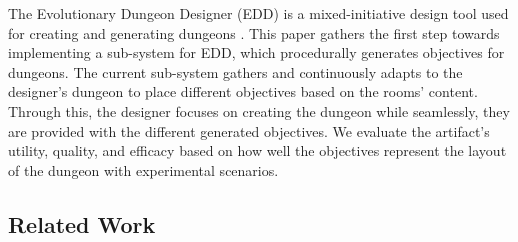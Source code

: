 
The Evolutionary Dungeon Designer (EDD) is a mixed-initiative design tool used for creating and generating dungeons \cite{p7alvarexempowering}. This paper gathers the first step towards implementing a sub-system for EDD, which procedurally generates objectives for dungeons. The current sub-system gathers and continuously adapts to the designer's dungeon to place different objectives based on the rooms' content. Through this, the designer focuses on creating the dungeon while seamlessly, they are provided with the different generated objectives. We evaluate the artifact's utility, quality, and efficacy based on how well the objectives represent the layout of the dungeon with experimental scenarios. 



\subsection{Related Work}
